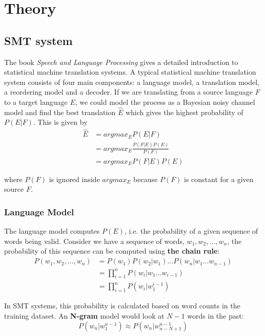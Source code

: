 \documentclass[12pt,a4paper,twoside,openright]{report}
\begin{document}
\section{Theory}

\subsection{SMT system}
The book \textit{Speech and Language Processing}\cite{Jurafsky:2009:SLP:1214993} gives a detailed introduction to statistical machine translation systems. A typical statistical machine translation system consists of four main components: a language model, a translation model, a reordering model and a decoder. If we are translating from a source language $F$ to a target language $E$, we could model the process as a Bayesian noisy channel model and find the best translation $\hat{E}$ which gives the highest probability of $P(E|F)$. This is given by
\begin{equation*}
    \begin{split}
        \hat{E} & = argmax_E P(E|F)\\
         & = argmax_E \frac{P(F|E)P(E)}{P(F)}\\
         & = argmax_E P(F|E)P(E)
    \end{split}
\end{equation*}

where $P(F)$ is ignored inside $argmax_E$ because $P(F)$ is constant for a given source $F$.

\subsubsection{Language Model}
The language model computes $P(E)$, i.e. the probability of a given sequence of words being valid. Consider we have a sequence of words, $w_1, w_2, \dots, w_n$, the probability of this sequence can be computed using \textbf{the chain rule}:
\begin{equation*}
\begin{split}
P(w_1, w_2, \dots, w_n) & = P(w_1)P(w_2|w_1)\dots P(w_n|w_1\dots w_{n-1})\\
 & = \prod_{i=1}^{n}P(w_i|w_1\dots w_{i-1})\\
 & = \prod_{i=1}^{n}P(w_i|w_1^{i-1})
\end{split}
\end{equation*}

In SMT systems, this probability is calculated based on word counts in the training dataset. An \textbf{N-gram} model would look at $N-1$ words in the past:
\begin{equation*}
P(w_n|w_1^{n-1}) \approx P(w_n|w_{n-N+1}^{n-1})
\end{equation*}
\end{document}
